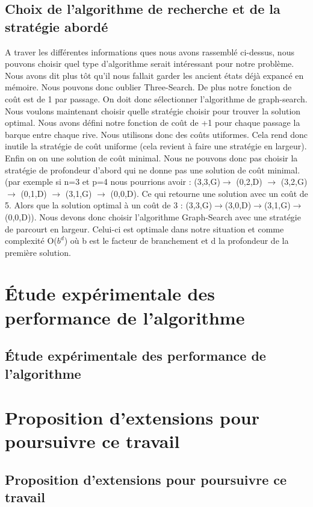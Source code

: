 \documentclass[a4paper, 12pt, french]{book}
\begin{document}
\section{Choix de l'algorithme de recherche et de la stratégie abordé}
A traver les différentes informations ques nous avons rassemblé ci-dessus, nous pouvons choisir quel type d'algorithme serait intéressant pour notre problème. Nous avons dit plus tôt qu'il nous fallait garder les ancient états déjà expancé en mémoire. Nous pouvons donc oublier Three-Search. De plus notre fonction de coût est de 1 par passage. On doit donc sélectionner l'algorithme de graph-search. Nous voulons maintenant choisir quelle stratégie choisir pour trouver la solution optimal. Nous avons défini notre fonction de coût de +1 pour chaque passage la barque entre chaque rive. Nous utilisons donc des coûts utiformes. Cela rend donc inutile la stratégie de coût uniforme (cela revient à faire une stratégie en largeur). Enfin on on une solution de coût minimal. Nous ne pouvons donc pas choisir la stratégie de profondeur d'abord qui ne donne pas une solution de coût minimal. (par exemple si n=3 et p=4 nous pourrions avoir : (3,3,G)$\rightarrow$ (0,2,D) $\rightarrow$ (3,2,G) $\rightarrow$ (0,1,D) $\rightarrow$ (3,1,G) $\rightarrow$ (0,0,D). Ce qui retourne une solution avec un coût de 5. Alors que la solution optimal à un coût de 3 : (3,3,G)$\rightarrow$(3,0,D)$\rightarrow$(3,1,G)$\rightarrow$(0,0,D)). Nous devons donc choisir l'algorithme Graph-Search avec une stratégie de parcourt en largeur. Celui-ci est optimale dans notre situation et comme complexité O($b^d$) où b est le facteur de branchement et d la profondeur de la première solution.

\chapter{Étude expérimentale des performance de l'algorithme}
\section{Étude expérimentale des performance de l'algorithme}
\chapter{Proposition d'extensions pour poursuivre ce travail}
\section{Proposition d'extensions pour poursuivre ce travail }
\end{document}
